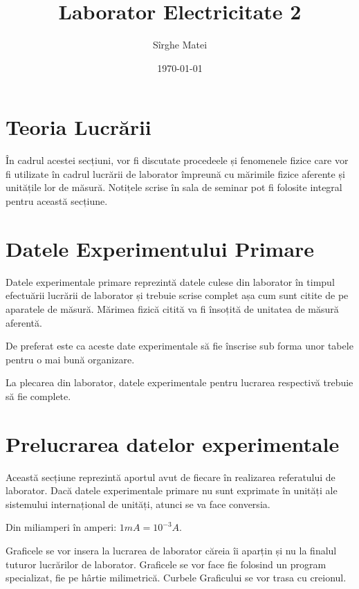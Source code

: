 \documentclass[12pt]{article}
\title{\bfseries Laborator Electricitate 2}
\author{Sîrghe Matei}
\date{\today}
\begin{document}
\maketitle

\section{Teoria Lucrării}
În cadrul acestei secțiuni, vor fi discutate procedeele și fenomenele fizice care vor fi utilizate în cadrul lucrării de laborator împreună
cu mărimile fizice aferente și unitățile lor de măsură. Notițele scrise în sala de seminar pot fi folosite integral pentru această secțiune.

\section{Datele Experimentului Primare}
Datele experimentale primare reprezintă datele culese din laborator în timpul efectuării lucrării de laborator și trebuie scrise complet așa
cum sunt citite de pe aparatele de măsură. Mărimea fizică citită va fi însoțită de unitatea de măsură aferentă.

\begin{tcolorbox}[colback=yellow!10!white, colframe=black, title=Observație]
De preferat este ca aceste date experimentale să fie înscrise sub forma unor tabele pentru o mai bună organizare.
\end{tcolorbox}

\begin{tcolorbox}[colback=yellow!10!white, colframe=black, title=Observație]
La plecarea din laborator, datele experimentale pentru lucrarea respectivă trebuie să fie complete.
\end{tcolorbox}

\section{Prelucrarea datelor experimentale}
Această secțiune reprezintă aportul avut de fiecare în realizarea referatului de laborator. Dacă datele experimentale primare nu sunt exprimate
în unități ale sistemului internațional de unități, atunci se va face conversia.

\begin{tcolorbox}[colback=yellow!10!white, colframe=black, title=Exemplu]
Din miliamperi în amperi: $1 mA = 10^{-3} A$.
\end{tcolorbox}

Graficele se vor insera la lucrarea de laborator căreia îi aparțin și nu la finalul tuturor lucrărilor de laborator. Graficele se vor face fie folosind
un program specializat, fie pe hârtie milimetrică. Curbele Graficului se vor trasa cu creionul.
\end{document}
